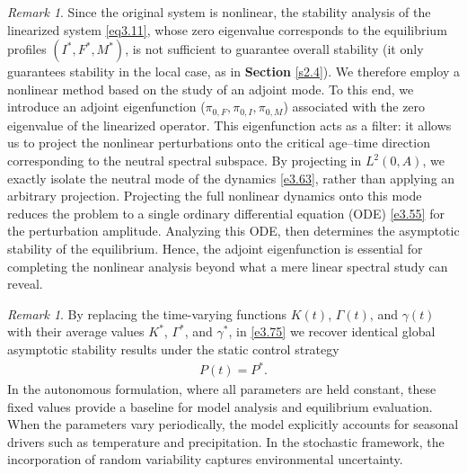 \documentclass[10pt, a4paper]{amsart}
\theoremstyle{plain}
\theoremstyle{definition}
\theoremstyle{remark}
\newtheorem{remark}[lemma]{Remark}
\numberwithin{equation}{section}
\begin{document}
\begin{remark}
Since the original system is nonlinear, the stability analysis of the linearized system \eqref{eq3.11}, whose zero eigenvalue corresponds to the equilibrium profiles $(I^*,F^*, M^*)$, is not sufficient to guarantee overall stability %
  (it only guarantees stability in the local case, as in {\bf Section} \ref{s2.4}). We therefore employ a nonlinear method based on the study of an adjoint mode. To this end, we introduce an adjoint eigenfunction ($\pi_{0,F},\pi_{0,I}, \pi_{0,M}$) associated with the zero eigenvalue of the linearized operator. This eigenfunction acts as a filter: it allows us to project the nonlinear perturbations onto the critical age–time direction corresponding to the neutral spectral subspace. By projecting in $L^2(0,A)$, we exactly isolate the neutral mode of the dynamics \eqref{e3.63}, rather than applying an arbitrary projection. Projecting the full nonlinear dynamics onto this mode reduces the problem to a single ordinary differential equation (ODE) \eqref{e3.55} for the perturbation amplitude. Analyzing this ODE, then determines the asymptotic stability of the equilibrium. Hence, the adjoint eigenfunction is essential for completing the nonlinear analysis beyond what a mere linear spectral study can reveal. 
\end{remark}

\begin{remark}
By replacing the time-varying functions $K(t)$, $\Gamma(t)$, and $\gamma(t)$ with their average values $K^*$, $\Gamma^*$, and $\gamma^*$, in \eqref{e3.75} we recover identical global asymptotic stability results under the static control strategy 
\begin{align}\label{e3.99}
P(t)=P^*.
\end{align}
In the autonomous formulation, where all parameters are held constant, these fixed values provide a baseline for model analysis and equilibrium evaluation. When the parameters vary periodically, the model explicitly accounts for seasonal drivers such as temperature and precipitation. In the stochastic framework, the incorporation of random variability captures environmental uncertainty.
\end{remark}
\end{document}
